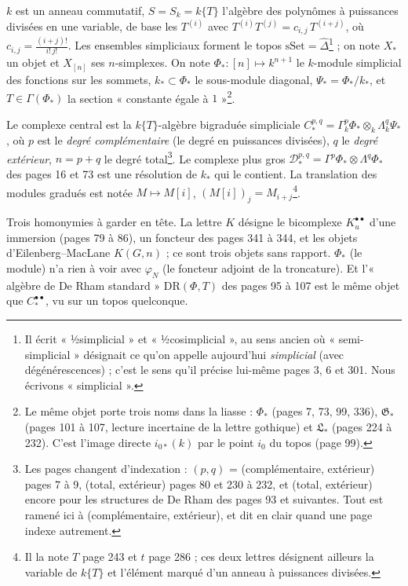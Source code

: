 \documentclass[11pt,a4paper]{article}
\begin{document}
$k$ est un anneau commutatif, $S = S_k = k\{T\}$ l'algèbre des polynômes à
puissances divisées en une variable, de base les $T^{(i)}$ avec
$T^{(i)} T^{(j)} = c_{i,j}\, T^{(i+j)}$, où
$c_{i,j} = \frac{(i+j)!}{i!\,j!}$. Les ensembles simpliciaux forment le topos
$\mathrm{sSet} = \widehat{\Delta}$\footnote{Il écrit « ½simplicial » et
« ½cosimplicial », au sens ancien où « semi-simplicial » désignait ce qu'on
appelle aujourd'hui \emph{simplicial} (avec dégénérescences) ; c'est le sens
qu'il précise lui-même pages 3, 6 et 301. Nous écrivons « simplicial ».} ; on
note $X_*$ un objet et $X_{[n]}$ ses $n$-simplexes. On note
$\Phi_* : [n] \mapsto k^{n+1}$ le $k$-module simplicial des fonctions sur les
sommets, $k_* \subset \Phi_*$ le sous-module diagonal, $\Psi_* = \Phi_*/k_*$, et
$T \in \Gamma(\Phi_*)$ la section « constante égale à $1$ »\footnote{Le même
objet porte trois noms dans la liasse : $\Phi_*$ (pages 7, 73, 99, 336),
$\mathfrak{G}_*$ (pages 101 à 107, lecture incertaine de la lettre gothique) et
$\mathfrak{L}_*$ (pages 224 à 232). C'est l'image directe $i_{0*}(k)$ par le
point $i_0$ du topos (page 99).}.

Le complexe central est la $k\{T\}$-algèbre bigraduée simpliciale
$C^{p,q}_* = \Gamma^p_k \Phi_* \otimes_k \Lambda^q_k \Psi_*$, où $p$ est le
\emph{degré complémentaire} (le degré en puissances divisées), $q$ le
\emph{degré extérieur}, $n = p + q$ le degré total\footnote{Les pages changent
d'indexation : $(p,q)$ = (complémentaire, extérieur) pages 7 à 9, (total,
extérieur) pages 80 et 230 à 232, et (total, extérieur) encore pour les
structures de De Rham des pages 93 et suivantes. Tout est ramené ici à
(complémentaire, extérieur), et dit en clair quand une page indexe autrement.}.
Le complexe plus gros $\mathcal{D}^{p,q}_* = \Gamma^p \Phi_* \otimes \Lambda^q
\Phi_*$ des pages 16 et 73 est une résolution de $k_*$ qui le contient. La
translation des modules gradués est notée $M \mapsto M[i]$,
$(M[i])_j = M_{i+j}$\footnote{Il la note $T$ page 243 et $t$ page 286 ; ces
deux lettres désignent ailleurs la variable de $k\{T\}$ et l'élément marqué
d'un anneau à puissances divisées.}.

Trois homonymies à garder en tête. La lettre $K$ désigne le bicomplexe
$K^{\bullet\bullet}_u$ d'une immersion (pages 79 à 86), un foncteur des pages
341 à 344, et les objets d'Eilenberg–MacLane $K(G,n)$ ; ce sont trois objets
sans rapport. $\Phi_*$ (le module) n'a rien à voir avec $\varphi_N$ (le
foncteur adjoint de la troncature). Et l'« algèbre de De Rham standard »
$\mathrm{DR}(\Phi, T)$ des pages 95 à 107 est le même objet que
$C^{\bullet\bullet}_*$, vu sur un topos quelconque.
\end{document}
